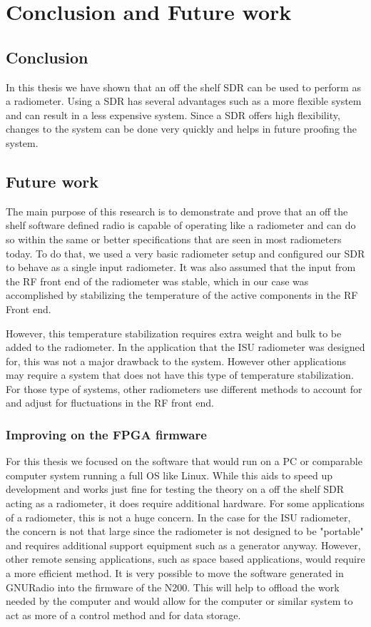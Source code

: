 \chapter{Conclusion and Future work} 

\section{Conclusion}
In this thesis we have shown that an off the shelf SDR can be used to perform as a radiometer.  Using a SDR has several advantages such as a more flexible system and can result in a less expensive system.  Since a SDR offers high flexibility, changes to the system can be done very quickly and helps in future proofing the system.  

\section{Future work}
The main purpose of this research is to demonstrate and prove that an off the shelf software defined radio is capable of operating like a radiometer and can do so within the same or better specifications that are seen in most radiometers today.  To do that, we used a very basic radiometer setup and configured our SDR to behave as a single input radiometer.  It was also assumed that the input from the RF front end of the radiometer was stable, which in our case was accomplished by stabilizing the temperature of the active components in the RF Front end.

However, this temperature stabilization requires extra weight and bulk to be added to the radiometer.  In the application that the ISU radiometer was designed for, this was not a major drawback to the system.  However other applications may require a system that does not have this type of temperature stabilization.  For those type of systems, other radiometers use different methods to account for and adjust for fluctuations in the RF front end. 

\subsection{Improving on the FPGA firmware}

For this thesis we focused on the software that would run on a PC or comparable computer system running a full OS like Linux.  While this aids to speed up development and works just fine for testing the theory on a off the shelf SDR acting as a radiometer, it does require additional hardware.  For some applications of a radiometer, this is not a huge concern.  In the case for the ISU radiometer, the concern is not that large since the radiometer is not designed to be "portable" and requires additional support equipment such as a generator anyway.  However, other remote sensing applications, such as space based applications, would require a more efficient method.  It is very possible to move the software generated in GNURadio into the firmware of the N200.  This will help to offload the work needed by the computer and would allow for the computer or similar system to act as more of a control method and for data storage.  

